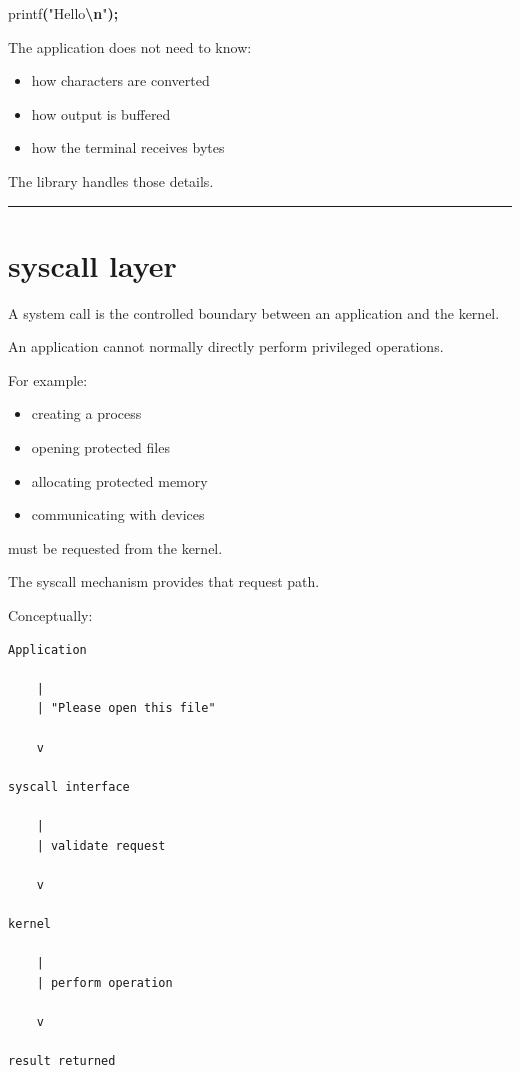 \documentclass[
  oneside,
  openany]{book}
\newenvironment{Shaded}{\begin{snugshade}}{\end{snugshade}}
\newcommand{\NormalTok}[1]{#1}
\newcommand{\OperatorTok}[1]{\textcolor[rgb]{0.81,0.36,0.00}{\textbf{#1}}}
\newcommand{\SpecialCharTok}[1]{\textcolor[rgb]{0.81,0.36,0.00}{\textbf{#1}}}
\newcommand{\StringTok}[1]{\textcolor[rgb]{0.31,0.60,0.02}{#1}}
\providecommand{\tightlist}{%
  \setlength{\itemsep}{0pt}\setlength{\parskip}{0pt}}
\begin{document}
\begin{Shaded}
\begin{Highlighting}[]
\NormalTok{printf}\OperatorTok{(}\StringTok{"Hello}\SpecialCharTok{\textbackslash{}n}\StringTok{"}\OperatorTok{);}
\end{Highlighting}
\end{Shaded}

The application does not need to know:

\begin{itemize}
\tightlist
\item
  how characters are converted
\item
  how output is buffered
\item
  how the terminal receives bytes
\end{itemize}

The library handles those details.

\begin{center}\rule{0.5\linewidth}{0.5pt}\end{center}

\hypertarget{syscall-layer}{%
\section{syscall layer}\label{syscall-layer}}

A system call is the controlled boundary between an application and the
kernel.

An application cannot normally directly perform privileged operations.

For example:

\begin{itemize}
\tightlist
\item
  creating a process
\item
  opening protected files
\item
  allocating protected memory
\item
  communicating with devices
\end{itemize}

must be requested from the kernel.

The syscall mechanism provides that request path.

Conceptually:

\begin{verbatim}
Application

    |
    | "Please open this file"

    v

syscall interface

    |
    | validate request

    v

kernel

    |
    | perform operation

    v

result returned
\end{verbatim}
\end{document}
